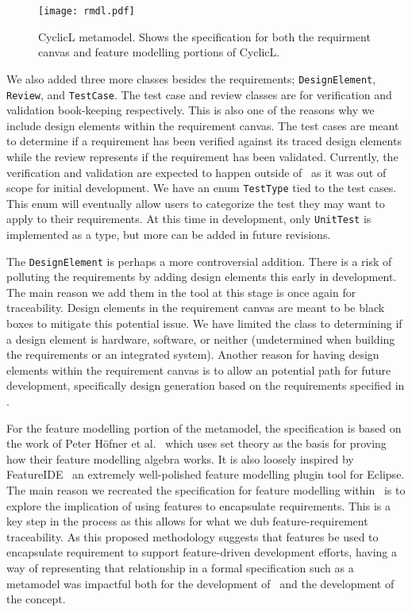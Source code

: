 \begin{figure}
	\centering
	\texttt{[image: rmdl.pdf]}
	\caption{CyclicL metamodel. Shows the specification for both the requirment canvas and feature modelling portions of CyclicL.}
	\label{fig:metamodel}
\end{figure}

We also added three more classes besides the requirements; \texttt{DesignElement}, \texttt{Review}, and \texttt{TestCase}. The test case and review classes are for verification and validation book-keeping respectively. This is also one of the reasons why we include design elements within the requirement canvas. The test cases are meant to determine if a requirement has been verified against its traced design elements while the review represents if the requirement has been validated. Currently, the verification and validation are expected to happen outside of \tool\ as it was out of scope for initial development. We have an enum \texttt{TestType} tied to the test cases. This enum will eventually allow users to categorize the test they may want to apply to their requirements. At this time in development, only \texttt{UnitTest} is implemented as a type, but more can be added in future revisions.

The \texttt{DesignElement} is perhaps a more controversial addition. There is a risk of polluting the requirements by adding design elements this early in development. The main reason we add them in the tool at this stage is once again for traceability. Design elements in the requirement canvas are meant to be black boxes to mitigate this potential issue. We have limited the class to determining if a design element is hardware, software, or neither (undetermined when building the requirements or an integrated system). Another reason for having design elements within the requirement canvas is to allow an potential path for future development, specifically design generation based on the requirements specified in \tool. 

For the feature modelling portion of the metamodel, the specification is based on the work of Peter H\"{o}fner et al.~\cite{hofner2006feature,hofner2011algebra} which uses set theory as the basis for proving how their feature modelling algebra works. It is also loosely inspired by FeatureIDE~\cite{kastner2009featureide, thum2014featureide} an extremely well-polished feature modelling plugin tool for Eclipse. The main reason we recreated the specification for feature modelling within \tool\ is to explore the implication of using features to encapsulate requirements. This is a key step in the process as this allows for what we dub feature-requirement traceability. As this proposed methodology suggests that features be used to encapsulate requirement to support feature-driven development efforts, having a way of representing that relationship in a formal specification such as a metamodel was impactful both for the development of \tool\ and the development of the concept.

